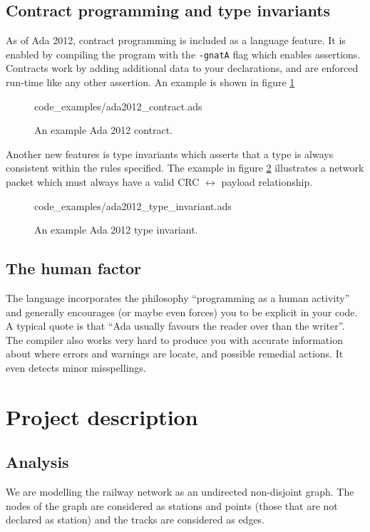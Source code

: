 \documentclass[10pt,a4paper]{article}
\def\Code#1{\texttt{#1}}
\begin{document}
\subsection{Contract programming and type invariants}
As of Ada 2012, contract programming is included as a language feature. It is enabled by compiling the program with the \Code{-gnatA} flag which enables assertions.
Contracts work by adding additional data to your declarations, and are enforced run-time like any other assertion. An example is shown in figure \ref{fig:ada2012_contract}
\begin{figure}[h]
\centering
 {code_examples/ada2012_contract.ads}
 \caption{An example Ada 2012 contract.}
 \label{fig:ada2012_contract}
\end{figure}

Another new features is type invariants which asserts that a type is always consistent within the rules specified. The example in figure \ref{fig:ada2012_type_invariant} illustrates a network packet which must always have a valid CRC $\leftrightarrow$ payload relationship.

\begin{figure}[h]
\centering
 {code_examples/ada2012_type_invariant.ads}
 \caption{An example Ada 2012 type invariant.}
 \label{fig:ada2012_type_invariant}
\end{figure}
\subsection{The human factor}
The language incorporates the philosophy ``programming as a human activity'' and generally encourages (or maybe even forces) you to be explicit in your code. A typical quote is that ``Ada usually favours the reader over than the writer''.
The compiler also works very hard to produce you with accurate information about where errors and warnings are locate, and possible remedial actions. It even detects minor misspellings.

\section{Project description}

\subsection{Analysis}
We are modelling the railway network as an undirected non-disjoint graph. The nodes of the graph are considered as stations and points (those that are not declared as station) and the tracks are considered as edges.
 
\end{document}
